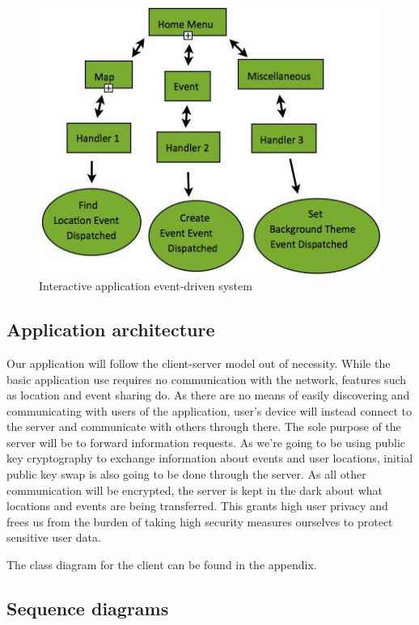 \documentclass[10pt,a4paper,oneside]{report}
\begin{document}
\begin{figure}[H]
 \centering
 \includegraphics[keepaspectratio, width=\textwidth]{event.png}
 \caption{Interactive application event-driven system}
\end{figure}

\subsection*{Application architecture}
Our application will follow the client-server model out of necessity. While the basic application use requires no communication with the network, features such as location and event sharing do. As there are no means of easily discovering and communicating with users of the application, user's device will instead connect to the server and communicate with others through there. The sole purpose of the server will be to forward information requests. As we're going to be using public key cryptography to exchange information about events and user locations, initial public key swap is also going to be done through the server. As all other communication will be encrypted, the server is kept in the dark about what locations and events are being transferred. This grants high user privacy and frees us from the burden of taking high security measures ourselves to protect sensitive user data.

The class diagram for the client can be found in the appendix.

\subsection*{Sequence diagrams}
\end{document}
